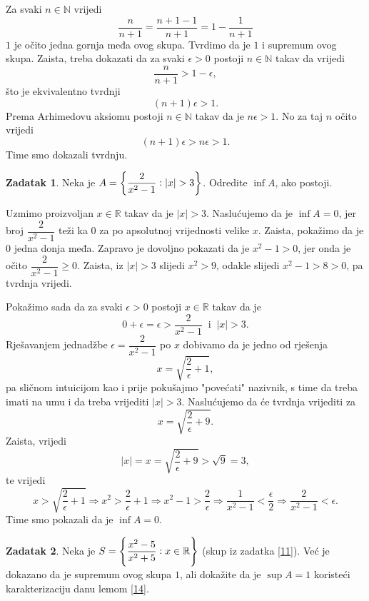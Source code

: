 \documentclass{book}
\let\originalleft\left
\let\originalright\right
\renewcommand{\left}{\mathopen{}\mathclose\bgroup\originalleft}
\renewcommand{\right}{\aftergroup\egroup\originalright}
\renewenvironment{proof}{%
    \vspace{-\parskip}\begin{oldproof}%
    }{%
    \end{oldproof}%
}
\theoremstyle{definition}
\theoremstyle{definition}
\newtheorem{exercise}{Zadatak}
\theoremstyle{remark}
\begin{document}
\begin{proof}[Rješenje]
Za svaki $n\in \mathbb{N}$ vrijedi
$$\dfrac{n}{n+1}=\dfrac{n+1-1}{n+1}=1-\dfrac{1}{n+1}$$
$1$ je očito jedna gornja međa ovog skupa. Tvrdimo da je $1$ i supremum ovog skupa. Zaista, treba dokazati da za svaki $\epsilon>0$ postoji $n\in \mathbb{N}$ takav da vrijedi
$$\dfrac{n}{n+1}>1-\epsilon,$$
što je ekvivalentno tvrdnji
$$(n+1)\epsilon>1.$$
Prema Arhimedovu aksiomu postoji $n\in \mathbb{N}$ takav da je $n\epsilon>1$. No za taj $n$ očito vrijedi $$(n+1)\epsilon>n\epsilon>1.$$ Time smo dokazali tvrdnju.
\end{proof}
\begin{exercise}
Neka je $A=\left\{\dfrac{2}{x^2-1} : |x|>3\right\}$. Odredite $\inf{A}$, ako postoji.
\end{exercise}
\begin{proof}[Rješenje]
Uzmimo proizvoljan  $x\in \mathbb{R}$ takav da je $|x|>3$. Naslućujemo da je $\inf{A}=0$, jer broj $\dfrac{2}{x^2-1}$ teži ka $0$ za po apsolutnoj vrijednosti velike $x$. Zaista, pokažimo da je $0$ jedna donja međa. Zapravo je dovoljno pokazati da je $x^2-1>0$, jer onda je očito $\dfrac{2}{x^2-1}\geq 0$. Zaista, iz $|x|>3$ slijedi $x^2>9$, odakle slijedi $x^2-1>8>0$, pa tvrdnja vrijedi. 

Pokažimo sada da za svaki $\epsilon >0$ postoji $x\in \mathbb{R}$ takav da je $$0+\epsilon=\epsilon>\dfrac{2}{x^2-1}\;\;\text{i}\;\; |x|>3.$$ Rješavanjem jednadžbe $\epsilon=\dfrac{2}{x^2-1}$ po $x$ dobivamo da je jedno od rješenja $$x=\sqrt{\dfrac{2}{\epsilon}+1},$$ pa sličnom intuicijom kao i prije pokušajmo "povećati" nazivnik, s time da treba imati na umu i da treba vrijediti $|x|>3$. Naslućujemo da će tvrdnja vrijediti za $$x=\sqrt{\dfrac{2}{\epsilon}+9}.$$ Zaista, vrijedi $$|x|=x=\sqrt{\dfrac{2}{\epsilon}+9}>\sqrt{9}=3,$$ te vrijedi
$$x>\sqrt{\dfrac{2}{\epsilon}+1}\Rightarrow x^2>\dfrac{2}{\epsilon}+1\Rightarrow x^2-1>\dfrac{2}{\epsilon}\Rightarrow \dfrac{1}{x^2-1}<\dfrac{\epsilon}{2}\Rightarrow \dfrac{2}{x^2-1}<\epsilon.$$
Time smo pokazali da je $\inf{A}=0$.
\end{proof}
\begin{exercise}
Neka je $S=\left\{\dfrac{x^2-5}{x^2+5} : x\in \mathbb{R}\right\}$ (skup iz zadatka \ref{11}). Već je dokazano da je supremum ovog skupa $1$, ali dokažite da je $\sup{A}=1$ koristeći karakterizaciju danu lemom \ref{14}.
\end{exercise}
\end{document}
